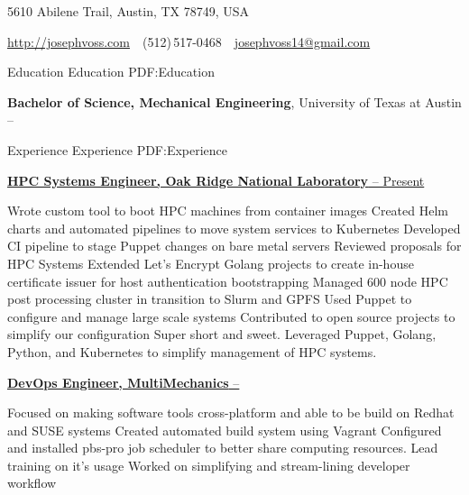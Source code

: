 \documentclass[letterpaper,MMMyyyy,nonstopmode]{simpleresumecv}
\newcommand{\CVAuthor}{Joseph Voss}
\newcommand{\CVWebpage}{http://josephvoss.com}
\begin{document}

\Title{\CVAuthor}

\begin{SubTitle}
{5610 Abilene Trail, Austin, TX 78749, USA}
\par
\href{\CVWebpage}
{\url{\CVWebpage}}
\,\SubBulletSymbol\,
(512)\,517-0468
\,\SubBulletSymbol\,
\href{mailto:josephvoss14@gmail.com}
{josephvoss14@gmail.com}

\end{SubTitle}

\begin{Body}

\BigGap

\Section
{Education}
{Education}
{PDF:Education}

\Entry
{\textbf{Bachelor of Science, Mechanical Engineering}},
University of Texas at Austin
\hfill
{} --


\Section
{Experience}
{Experience}
{PDF:Experience}
\Entry

\href{http://olcf.ornl.gov}
{\textbf{HPC Systems Engineer, Oak Ridge National Laboratory}
  \hfill {} -- Present}
\Gap
\begin{Detail}
\BulletItem
Wrote custom tool to boot HPC machines from container images
\BulletItem
Created Helm charts and automated pipelines to move system services to
  Kubernetes
\BulletItem
Developed CI pipeline to stage Puppet changes on bare metal servers
\BulletItem
Reviewed proposals for HPC Systems
\BulletItem
Extended Let's Encrypt Golang projects to create in-house certificate issuer for
  host authentication bootstrapping
\BulletItem
Managed 600 node HPC post processing cluster in transition to Slurm and GPFS
\BulletItem
Used Puppet to configure and manage large scale systems
\BulletItem
Contributed to open source projects to simplify our configuration
\BulletItem
Super short and sweet. Leveraged Puppet, Golang, Python, and Kubernetes to
  simplify management of HPC systems.

\end{Detail}

\BigGap 
\Entry
\href{http://multimechanics.com}
{\textbf{DevOps Engineer, MultiMechanics}
  \hfill
   --
   }
\Gap
\begin{Detail}
\BulletItem
Focused on making software tools cross-platform and able to be build on \newline
  Redhat and SUSE systems
\BulletItem
Created automated build system using Vagrant
\BulletItem
Configured and installed pbs-pro job scheduler to better share computing
    \newline resources. Lead training on it's usage
\BulletItem
Worked on simplifying and stream-lining developer workflow
\end{Detail}


\end{Body}
\end{document}
